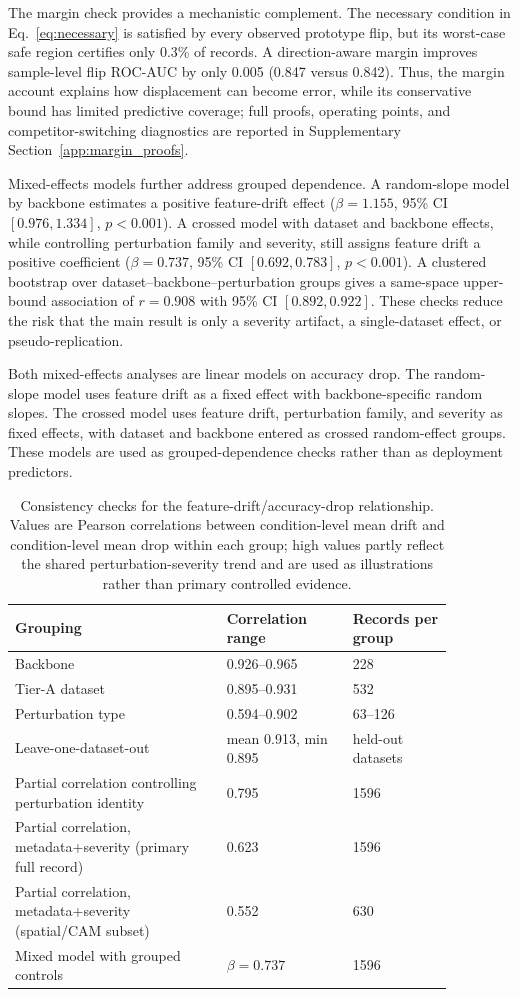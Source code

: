\documentclass[a4paper,fleqn]{els-cas-templates/cas-sc}
\begin{document}
The margin check provides a mechanistic complement. The necessary condition in
Eq.~\eqref{eq:necessary} is satisfied by every observed prototype flip, but its
worst-case safe region certifies only 0.3\% of records. A direction-aware margin improves
sample-level flip ROC-AUC by only 0.005 (0.847 versus 0.842). Thus, the margin
account explains how displacement can become error, while its conservative
bound has limited predictive coverage;
full proofs, operating points, and competitor-switching diagnostics are reported
in Supplementary Section~\ref{app:margin_proofs}.

Mixed-effects models further address grouped dependence. A random-slope model by backbone estimates a positive feature-drift effect ($\beta=1.155$, 95\% CI $[0.976,1.334]$, $p<0.001$). A crossed model with dataset and backbone effects, while controlling perturbation family and severity, still assigns feature drift a positive coefficient ($\beta=0.737$, 95\% CI $[0.692,0.783]$, $p<0.001$). A clustered bootstrap over dataset--backbone--perturbation groups gives a same-space upper-bound association of $r=0.908$ with 95\% CI $[0.892,0.922]$. These checks reduce the risk that the main result is only a severity artifact, a single-dataset effect, or pseudo-replication.

Both mixed-effects analyses are linear models on accuracy drop. The random-slope
model uses feature drift as a fixed effect with backbone-specific random slopes.
The crossed model uses feature drift, perturbation family, and severity as fixed
effects, with dataset and backbone entered as crossed random-effect groups. These
models are used as grouped-dependence checks rather than as deployment predictors.

\begin{table}[pos=htbp]
\centering
\caption{Consistency checks for the feature-drift/accuracy-drop relationship. Values are Pearson correlations between condition-level mean drift and condition-level mean drop within each group; high values partly reflect the shared perturbation-severity trend and are used as illustrations rather than primary controlled evidence.}
\label{tab:consistency}
\footnotesize
\begin{tabular}{p{0.42\linewidth}p{0.25\linewidth}p{0.20\linewidth}}
\toprule
Grouping & Correlation range & Records per group \\
\midrule
Backbone & 0.926--0.965 & 228 \\
Tier-A dataset & 0.895--0.931 & 532 \\
Perturbation type & 0.594--0.902 & 63--126 \\
Leave-one-dataset-out & mean 0.913, min 0.895 & held-out datasets \\
Partial correlation controlling perturbation identity & 0.795 & 1596 \\
Partial correlation, metadata+severity (primary full record) & 0.623 & 1596 \\
Partial correlation, metadata+severity (spatial/CAM subset) & 0.552 & 630 \\
Mixed model with grouped controls & $\beta=0.737$ & 1596 \\
\bottomrule
\end{tabular}
\end{table}
\end{document}
